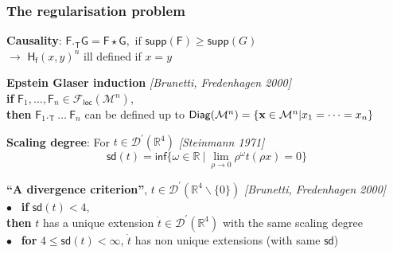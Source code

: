 \documentclass[9pt]{beamer}
\renewcommand{\inf}{\mathsf{inf}} %
\newcommand{\supp}{\mathsf{supp}} %
\newcommand{\sd}{\mathsf{sd}} %
\newcommand{\citebeam}[1]{\textit{\textcolor{black!60!white}{[#1]}}} %
\newcommand{\Dcal}{\mathcal{D}}
\newcommand{\Fcal}{\mathcal{F}}
\newcommand{\Mcal}{\mathcal{M}}
\newcommand{\Rbb}{\mathbb{R}}
\newcommand{\Fsf}{\mathsf{F}}
\newcommand{\Gsf}{\mathsf{G}}
\newcommand{\Hsf}{\mathsf{H}}
\newcommand{\Tsf}{\mathsf{T}}
\newcommand{\fsf}{\mathsf{f}}
\begin{document}
\begin{frame}[label=regul_prob]

\frametitle{The regularisation problem}

\textbf{Causality}: \quad $\Fsf ._\Tsf \Gsf = \Fsf \star \Gsf, \mbox{ if } \supp(\Fsf) \geq \supp(G)$ \\
$\to$ %
$\Hsf_\fsf(x,y)^n$  ill defined if $x=y$ \\[5pt]

\begin{exampleblock}{}
\vspace*{-2ex}
\textbf{Epstein Glaser induction} \citebeam{Brunetti, Fredenhagen 2000} \hfill \hyperlink{proof_EG_induction}{} \\
\textbf{if} $\Fsf_1, \dots, \Fsf_n \in \Fcal_\mathsf{loc}(\Mcal^n)$, \\
\textbf{then} $\Fsf_1 ._\Tsf \ \dots \ \Fsf_n$ can be defined up to $\mathsf{Diag}(\Mcal^n)=\{{\bf x}\in \Mcal^n  | x_1 = \dots = x_n\}$ \\[5pt]
\vspace*{-1ex}
\end{exampleblock}

\textbf{Scaling degree}: For $t \in \Dcal^\prime(\Rbb^4)$ \citebeam{Steinmann 1971} \hfill %
\\[-15pt]
\begin{equation*}
\sd(t) = \inf \{\omega\in\Rbb \ | \ \lim_{\rho \to 0}\rho^\omega t(\rho x)=0 \} 
\end{equation*}

\vspace*{-8pt}

\begin{block}{}
\vspace*{-10pt}
\textbf{``A divergence criterion''}, $t \in \Dcal^\prime(\Rbb^4\backslash\{0\})$ \quad \citebeam{Brunetti, Fredenhagen 2000} \\
$\bullet$ \ \textbf{if} $\sd(t) < 4$, \\
\hspace*{8pt} \textbf{then} $t$ has a unique extension $\dot{t} \in \Dcal^\prime(\Rbb^4)$ with the same scaling degree \\
$\bullet$ \ \textbf{for} $4 \leq \sd(t) < \infty$, $\dot{t}$ has non unique extensions (with same $\sd$)
\end{block}



\end{frame}
\end{document}
